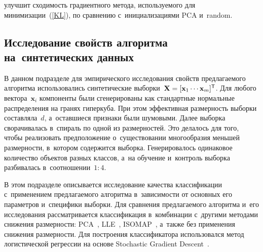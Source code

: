 \begin{multicols}{2}

\noindent
 улучшит сходимость градиентного метода, 
используемого для минимизации~(\ref{KL}), по сравнению с~инициализациями PCA и~random.

\vspace*{-2pt}

\subsection{Исследование свойств алгоритма на~синтетических данных}

\vspace*{-1pt}

В данном подразделе для эмпирического исследования свойств предлагаемого 
алгоритма использовались синтетические выборки~$\mathbf{X} \hm= 
[\mathbf x_1 \cdots \mathbf x_m]^{\TSF}$. Для любого вектора~$\mathbf x_i$ компоненты 
были сгенерированы как стандартные нормальные распределения на гранях гиперкуба. 
При этом эффективная размерность выборки составляла~$d$, а~оставшиеся 
признаки были шумовыми. Далее выборка сворачивалась в~спираль по одной из 
размерностей. Это делалось для того, чтобы реализовать предположение 
о~существовании многообразия меньшей размерности, в~котором содержится выборка. 
Генерировалось одинаковое количество объектов разных классов, 
а~на обучение и~контроль выборка разбивалась в~соотношении~$1:4$.

В этом подразделе описывается исследование качества классификации с~применением 
предлагаемого алгоритма в~зависимости от основных его па\-ра\-мет\-ров и~специфики выборки. 
Для сравнения предлагаемого алгоритма и~его исследования рассматривается классификация 
в~комбинации с~другими методами снижения размерности: 
PCA~\cite{kim2007distance}, LLE~\cite{roweis2000nonlinear}, 
ISOMAP~\cite{tenenbaum2000global}, а~также без применения снижения 
размерности. Для построения классификатора использовался метод логистической 
регрессии на основе Stochastic Gradient Descent~\cite{bottou2012stochastic}.


\end{multicols}
